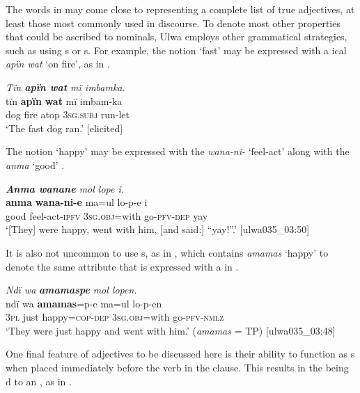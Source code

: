 The words in  may come close to representing a complete list of true adjectives, at least those most commonly used in discourse. To denote most other properties that could be ascribed to nominals, Ulwa employs other grammatical strategies, such as using s or s. For example, the notion ‘fast’ may be expressed with a ical  \textit{apïn wat} ‘on fire’, as in .

\ea%
    \label{ex:adj:23}
          \textit{Tïn \textbf{apïn wat} mï imbamka.}\\
\gll    tïn    \textbf{apïn}  \textbf{wat}  mï      imbam-ka\\
    dog  fire    atop  3\textsc{sg.subj}  run-let\\
\glt `The fast dog ran.’ [elicited]
\z

The notion ‘happy’ may be expressed with the  \textit{wana-ni-} ‘feel-act’ along with the  \textit{anma} ‘good’ .

\ea%
    \label{ex:adj:24}
          \textit{\textbf{Anma wanane} mol lope i.}\\
\gll    \textbf{anma}  \textbf{wana-ni-e}    ma=ul      lo-p-e      i\\
    good  feel-act-\textsc{ipfv}  3\textsc{sg.obj}=with  go-\textsc{pfv-dep}  yay\\
\glt `[They] were happy, went with him, [and said:] “yay!”.’ [ulwa035\_03:50]
\z

It is also not uncommon to use  s, as in , which contains  \textit{amamas} ‘happy’ to denote the same attribute that is expressed with a  in .

\ea%
    \label{ex:adj:25}
          \textit{Ndï wa} \textbf{\textit{amamaspe}} \textit{mol lopen.}\\
\gll    ndï    wa  \textbf{amamas}=p-e    ma=ul      lo-p-en\\
    3\textsc{pl}    just  happy=\textsc{cop-dep}  3\textsc{sg.obj}=with  go-\textsc{pfv-nmlz}\\
\glt `They were just happy and went with him.’ (\textit{amamas} = TP) [ulwa035\_03:48]
\z

One final feature of adjectives to be discussed here is their ability to function as s when placed immediately before the verb in the clause. This results in the  being d to an , as in .


